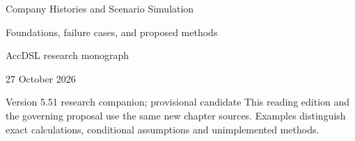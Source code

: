 \documentclass[11pt,a4paper]{report}
\begin{document}
\hypersetup{pageanchor=false}
\begin{titlepage}
{\Huge Company Histories and Scenario Simulation\par}
\vspace{12mm}
{\Large Foundations, failure cases, and proposed methods\par}
\vspace{8mm}
AccDSL research monograph\par 27 October 2026\par Version 5.51 research companion; provisional candidate
\vfill
This reading edition and the governing proposal use the same new chapter sources. Examples distinguish exact calculations, conditional assumptions and unimplemented methods.
\end{titlepage}
\hypersetup{pageanchor=true}
\tableofcontents
\clearpage{}


























\clearpage\label{sim:body-end}

\begingroup\raggedright
\endgroup
\end{document}
